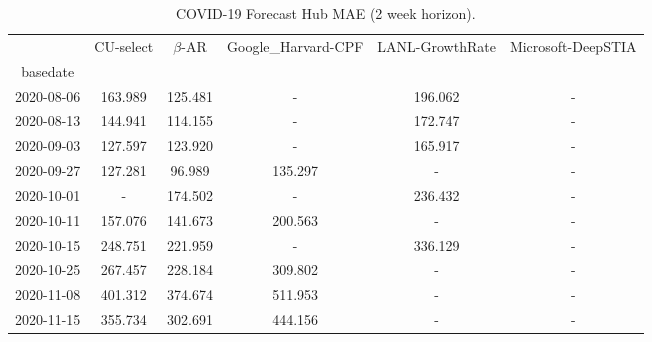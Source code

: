     
\begin{table*}[t]
\small
\caption{COVID-19 Forecast Hub MAE (2 week horizon).\label{tab:reichalb_eval_2} }

\centering
    
\begin{tabular}{cccccc}
\toprule
{} &                      CU-select &                     $\beta$-AR &            Google\_Harvard-CPF & LANL-GrowthRate &             Microsoft-DeepSTIA \\
basedate   &                                &                                &                                &                 &                                \\
\midrule
2020-08-06 &                        163.989 &  {\cellcolor{blue!25} 125.481} &                              - &         196.062 &                              - \\
2020-08-13 &                        144.941 &  {\cellcolor{blue!25} 114.155} &                              - &         172.747 &                              - \\
2020-09-03 &                        127.597 &  {\cellcolor{blue!25} 123.920} &                              - &         165.917 &                              - \\
2020-09-27 &                        127.281 &   {\cellcolor{blue!25} 96.989} &                        135.297 &               - &                              - \\
2020-10-01 &                              - &  {\cellcolor{blue!25} 174.502} &                              - &         236.432 &                              - \\
2020-10-11 &                        157.076 &  {\cellcolor{blue!25} 141.673} &                        200.563 &               - &                              - \\
2020-10-15 &                        248.751 &  {\cellcolor{blue!25} 221.959} &                              - &         336.129 &                              - \\
2020-10-25 &                        267.457 &  {\cellcolor{blue!25} 228.184} &                        309.802 &               - &                              - \\
2020-11-08 &                        401.312 &  {\cellcolor{blue!25} 374.674} &                        511.953 &               - &                              - \\
2020-11-15 &                        355.734 &  {\cellcolor{blue!25} 302.691} &                        444.156 &               - &                              - \\

\end{tabular}
\end{table*}
